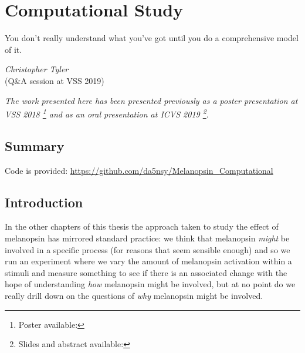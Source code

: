 \chapter{Computational Study}
\label{ComputationalStudyChapter}

\epigraph{You don't really understand what you've got until you do a comprehensive model of it.}
{\textit{Christopher Tyler} \\ (Q\&A session at VSS 2019)}

\textit{The work presented here has been presented previously as a poster presentation at VSS 2018 \citep{garside_does_2018}\footnote{Poster available: } and as an oral presentation at ICVS 2019 \footnote{Slides and abstract available: }}.

\section{Summary}



Code is provided: \url{https://github.com/da5nsy/Melanopsin_Computational}

\section{Introduction}

In the other chapters of this thesis the approach taken to study the effect of melanopsin has mirrored standard practice: we think that melanopsin \emph{might} be involved in a specific process (for reasons that seem sensible enough) and so we run an experiment where we vary the amount of melanopsin activation within a stimuli and measure something to see if there is an associated change with the hope of understanding \emph{how} melanopsin might be involved, but at no point do we really drill down on the questions of \emph{why} melanopsin might be involved.

